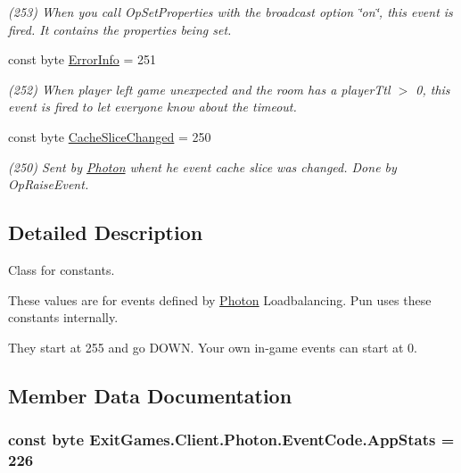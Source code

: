 \begin{DoxyCompactItemize}
\begin{DoxyCompactList}\small\item\em (253) When you call Op\+Set\+Properties with the broadcast option \char`\"{}on\char`\"{}, this event is fired. It contains the properties being set.\end{DoxyCompactList}\item 
const byte \hyperlink{class_exit_games_1_1_client_1_1_photon_1_1_event_code_a5515318245655c141be84934f461053c}{Error\+Info} = 251
\begin{DoxyCompactList}\small\item\em (252) When player left game unexpected and the room has a player\+Ttl $>$ 0, this event is fired to let everyone know about the timeout. \end{DoxyCompactList}\item 
const byte \hyperlink{class_exit_games_1_1_client_1_1_photon_1_1_event_code_ae7cdbabb27d642ad791221180e5ff1f0}{Cache\+Slice\+Changed} = 250
\begin{DoxyCompactList}\small\item\em (250) Sent by \hyperlink{namespace_exit_games_1_1_client_1_1_photon}{Photon} whent he event cache slice was changed. Done by Op\+Raise\+Event.\end{DoxyCompactList}\end{DoxyCompactItemize}


\subsection{Detailed Description}
Class for constants. 

These values are for events defined by \hyperlink{namespace_exit_games_1_1_client_1_1_photon}{Photon} Loadbalancing. Pun uses these constants internally. 

They start at 255 and go D\+O\+WN. Your own in-\/game events can start at 0.

\subsection{Member Data Documentation}
\subsubsection[{\texorpdfstring{App\+Stats}{AppStats}}]{\setlength{\rightskip}{0pt plus 5cm}const byte Exit\+Games.\+Client.\+Photon.\+Event\+Code.\+App\+Stats = 226}\hypertarget{class_exit_games_1_1_client_1_1_photon_1_1_event_code_ad91a28567590ac06accfd7ab9df53b9e}{}\label{class_exit_games_1_1_client_1_1_photon_1_1_event_code_ad91a28567590ac06accfd7ab9df53b9e}


